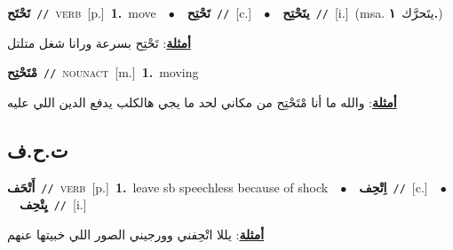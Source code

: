 \documentclass[10pt,a4paper,twoside]{article} %
\begin{document}
\begin{multicols}{2}
{\setlength\topsep{0pt}\textbf{\foreignlanguage{arabic}{تَحْتَح}}\ {\color{gray}\texttt{//}\color{black}}\ \textsc{verb}\ [p.]\ \textbf{1.}~move\ \ $\bullet$\ \ \setlength\topsep{0pt}\textbf{\foreignlanguage{arabic}{تَحْتِح}}\ {\color{gray}\texttt{//}\color{black}}\ [c.]\ \ $\bullet$\ \ \setlength\topsep{0pt}\textbf{\foreignlanguage{arabic}{يتَحْتِح}}\ {\color{gray}\texttt{//}\color{black}}\ [i.]\ \color{gray}(msa. \foreignlanguage{arabic}{يتَحرَّك}~\foreignlanguage{arabic}{\textbf{١.}})\color{black}\  \begin{flushright}\color{gray}\foreignlanguage{arabic}{\textbf{\underline{\foreignlanguage{arabic}{أمثلة}}}: تَحْتِح بسرعة ورانا شغل متلتل}\end{flushright}\color{black}} \vspace{2mm}

{\setlength\topsep{0pt}\textbf{\foreignlanguage{arabic}{مْتَحْتِح}}\ {\color{gray}\texttt{//}\color{black}}\ \textsc{noun\textunderscore act}\ [m.]\ \textbf{1.}~moving\  \begin{flushright}\color{gray}\foreignlanguage{arabic}{\textbf{\underline{\foreignlanguage{arabic}{أمثلة}}}: والله ما أنا مْتَحْتِح من مكاني لحد ما يجي هالكلب يدفع الدين اللي عليه}\end{flushright}\color{black}} \vspace{2mm}

\vspace{-3mm}
\subsection*{\color{blue}\foreignlanguage{arabic}{ت.ح.ف}\color{blue}{}} 

{\setlength\topsep{0pt}\textbf{\foreignlanguage{arabic}{أَتْحَف}}\ {\color{gray}\texttt{//}\color{black}}\ \textsc{verb}\ [p.]\ \textbf{1.}~leave sb speechless because of shock\ \ $\bullet$\ \ \setlength\topsep{0pt}\textbf{\foreignlanguage{arabic}{اِتْحِف}}\ {\color{gray}\texttt{//}\color{black}}\ [c.]\ \ $\bullet$\ \ \setlength\topsep{0pt}\textbf{\foreignlanguage{arabic}{يِتْحِف}}\ {\color{gray}\texttt{//}\color{black}}\ [i.]\  \begin{flushright}\color{gray}\foreignlanguage{arabic}{\textbf{\underline{\foreignlanguage{arabic}{أمثلة}}}: يللا اتْحِفني وورجيني الصور اللي خبيتها عنهم}\end{flushright}\color{black}} \vspace{2mm}


\end{multicols}
\end{document}
